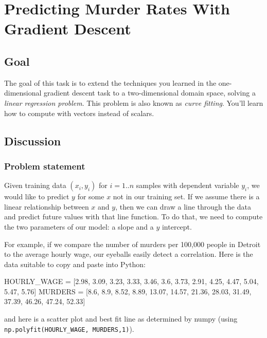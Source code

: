 \chapter{Predicting Murder Rates With Gradient Descent}

\section{Goal}

\begin{fullwidth}

The goal of this task is to extend the techniques you learned in the one-dimensional gradient descent task to a two-dimensional domain space, solving a {\em linear regression problem}.  This problem is also known as {\em curve fitting}. You'll learn how to compute with vectors instead of scalars.

\section{Discussion}

\subsection{Problem statement}

Given training data $(x_i, y_i)$ for $i=1..n$ samples with dependent variable $y_i$, we would like to predict $y$ for some $x$ not in our training set. If we assume there is a linear relationship between $x$ and $y$, then we can draw a line through the data and predict future values with that line function. To do that, we need to compute the two parameters of our model: a slope and a $y$ intercept. 

For example, if we compare the number of murders per 100,000 people in Detroit to the average hourly wage, our eyeballs easily detect a correlation.  Here is the data suitable to copy and paste into Python:

\begin{pyverbatim}
HOURLY_WAGE = [2.98, 3.09, 3.23, 3.33, 3.46, 3.6, 3.73, 2.91, 4.25, 4.47, 5.04, 5.47, 5.76]
MURDERS = [8.6, 8.9, 8.52, 8.89, 13.07, 14.57, 21.36, 28.03, 31.49, 37.39, 46.26, 47.24, 52.33]
\end{pyverbatim}

\noindent and here is a scatter plot and best fit line as determined by numpy (using {\tt\footnotesize np.polyfit(HOURLY\_WAGE, MURDERS,1)}).


\end{fullwidth}
